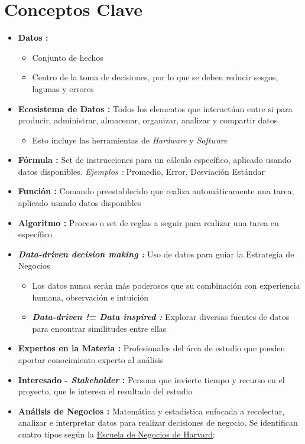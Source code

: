 \section{Conceptos Clave}
\begin{itemize}
    \item {\textbf{Datos : }
    \begin{itemize}
        \item {Conjunto de hechos}
        \item {Centro de la toma de decisiones, por lo que se deben reducir sesgos, lagunas y errores}
    \end{itemize}}
    \item {\textbf{Ecosistema de Datos : }Todos los elementos que interactúan entre si para producir, administrar, almacenar, organizar, analizar y compartir datos
    \begin{itemize}
        \item {Esto incluye las herramientas de \textit{Hardware} y \textit{Software}}
    \end{itemize}}
    \item {\textbf{Fórmula : }Set de instrucciones para un cálculo específico, aplicado usando datos disponibles. \textit{Ejemplos : }Promedio, Error, Desviación Estándar}
    \item {\textbf{Función : }Comando preestablecido que realiza automáticamente una tarea, aplicado usando datos disponibles}
    \item {\textbf{Algoritmo : }Proceso o set de reglas a seguir para realizar una tarea en específico}
    \item {\textbf{\textit{Data-driven decision making : }}Uso de datos para guiar la Estrategia de Negocios 
    \begin{itemize}
        \item {Los datos nunca serán más poderosos que su combinación con experiencia humana, observación e intuición}
        \item {\textit{\textbf{Data-driven != Data inspired : }}Explorar diversas fuentes de datos para encontrar similitudes entre ellas}
    \end{itemize}}
    \item {\textbf{Expertos en la Materia : }Profesionales del área de estudio que pueden aportar conocimiento experto al análisis}
    \item {\textbf{Interesado - \textit{Stakeholder} : }Persona que invierte tiempo y recurso en el proyecto, que le interesa el resultado del estudio}
    \item {\textbf{Análisis de Negocios : }Matemática y estadística enfocada a recolectar, analizar e interpretar datos para realizar decisiones de negocio. Se identifican cuatro tipos según la \href{https://online.hbs.edu/blog/post/business-analytics-examples}{Escuela de Negocios de Harvard}:
}
\end{itemize}
